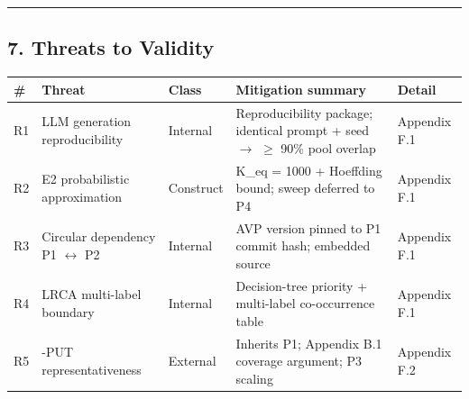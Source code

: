 \documentclass[review,12pt,authoryear]{elsarticle}
\newcounter{none}                   %
\begin{document}
\begin{center}\rule{0.5\linewidth}{0.5pt}\end{center}

\subsection{7. Threats to Validity}\label{threats-to-validity}

{\def\LTcaptype{none} %
\begin{longtable}[]{@{}
  >{\raggedright\arraybackslash}p{}
  >{\raggedright\arraybackslash}p{}
  >{\raggedright\arraybackslash}p{}
  >{\raggedright\arraybackslash}p{}
  >{\raggedright\arraybackslash}p{}@{}}
\toprule\noalign{}
\begin{minipage}[b]{\linewidth}\raggedright
\#
\end{minipage} & \begin{minipage}[b]{\linewidth}\raggedright
Threat
\end{minipage} & \begin{minipage}[b]{\linewidth}\raggedright
Class
\end{minipage} & \begin{minipage}[b]{\linewidth}\raggedright
Mitigation summary
\end{minipage} & \begin{minipage}[b]{\linewidth}\raggedright
Detail
\end{minipage} \\
\midrule\noalign{}
\endhead
\bottomrule\noalign{}
\endlastfoot
R1 & LLM generation reproducibility & Internal & Reproducibility
package; identical prompt + seed $\to$ $\geq$ 90\% pool overlap & Appendix F.1 \\
R2 & E2 probabilistic approximation & Construct & K\_eq = 1000 +
Hoeffding bound; sweep deferred to P4 & Appendix F.1 \\
R3 & Circular dependency P1 $\leftrightarrow$ P2 & Internal & AVP version pinned to P1
commit hash; embedded source & Appendix F.1 \\
R4 & LRCA multi-label boundary & Internal & Decision-tree priority +
multi-label co-occurrence table & Appendix F.1 \\
R5 & 12-PUT representativeness & External & Inherits P1; Appendix B.1
coverage argument; P3 scaling & Appendix F.2 \\

\end{longtable}}
\end{document}
